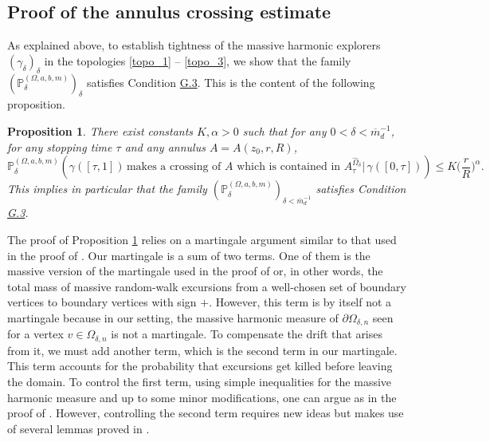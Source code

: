 \documentclass{article}
\newcommand{\PP}{{\mathbb{P}}}
\newtheorem{proposition}[theorem]{Proposition}
\theoremstyle{definition}
\theoremstyle{remark}
\theoremstyle{remark}
\begin{document}
\subsection{Proof of the annulus crossing estimate} \label{sec_proof_crossing}

As explained above, to establish tightness of the massive harmonic explorers $(\gamma_{\delta})_{\delta}$ in the topologies \eqref{topo_1} -- \eqref{topo_3}, we show that the family $(\PP_{\delta}^{(\Omega,a,b,m)})_{\delta}$ satisfies Condition \hyperref[condG3]{G.3}. This is the content of the following proposition.

\begin{proposition} \label{prop_crossing}
There exist constants $K, \alpha>0$ such that for any $0<\delta<\overline{m}_d^{-1}$, for any stopping time $\tau$ and any annulus $A=A(z_0,r,R)$,
\begin{equation*}
    \PP_{\delta}^{(\Omega,a,b,m)}(\gamma([\tau,1]) \, \text{makes a crossing of $A$ which is contained in $A_{\tau}^{\hat \Omega_{\delta}}$} \vert \, \gamma([0,\tau])) \leq K \bigg (\frac{r}{R}\bigg)^{\alpha}.
\end{equation*}
This implies in particular that the family $(\PP_{\delta}^{(\Omega,a,b,m)})_{\delta < \overline{m}_d^{-1}}$ satisfies Condition \hyperref[condG3]{G.3}.
\end{proposition}

The proof of Proposition \ref{prop_crossing} relies on a martingale argument similar to that used in the proof of \cite[Proposition~6.3]{HE}. Our martingale is a sum of two terms. One of them is the massive version of the martingale used in the proof of \cite[Proposition~6.3]{HE} or, in other words, the total mass of massive random-walk excursions from a well-chosen set of boundary vertices to boundary vertices with sign $+$. However, this term is by itself not a martingale because in our setting, the massive harmonic measure of $\partial \Omega_{\delta,n}$ seen for a vertex $v \in \Omega_{\delta,n}$ is not a martingale. To compensate the drift that arises from it, we must add another term, which is the second term in our martingale. This term accounts for the probability that excursions get killed before leaving the domain. To control the first term, using simple inequalities for the massive harmonic measure and up to some minor modifications, one can argue as in the proof of \cite[Propostion~6.3]{HE}. However, controlling the second term requires new ideas but makes use of several lemmas proved in \cite{HE}.
\end{document}
